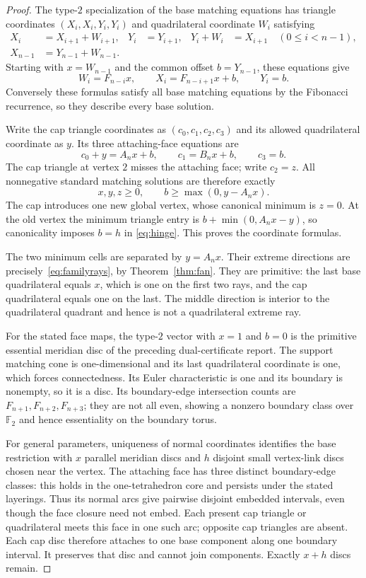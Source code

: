 \begin{proof}
The type-$2$ specialization of the base matching equations has triangle
coordinates $(X_i,X_i,Y_i,Y_i)$ and quadrilateral coordinate $W_i$ satisfying
\begin{align*}
 X_i&=X_{i+1}+W_{i+1},&Y_i&=Y_{i+1},&
 Y_i+W_i&=X_{i+1}\quad (0\le i<n-1),\\
 X_{n-1}&=Y_{n-1}+W_{n-1}.&&&
\end{align*}
Starting with $x=W_{n-1}$ and the common offset $b=Y_{n-1}$, these equations
give
\[
 W_i=F_{n-i}x,\qquad X_i=F_{n-i+1}x+b,\qquad Y_i=b.
\]
Conversely these formulas satisfy all base matching equations by the
Fibonacci recurrence, so they describe every base solution.

Write the cap triangle coordinates as $(c_0,c_1,c_2,c_3)$ and its allowed
quadrilateral coordinate as $y$. Its three attaching-face equations are
\[
 c_0+y=A_nx+b,\qquad c_1=B_nx+b,\qquad c_3=b.
\]
The cap triangle at vertex $2$ misses the attaching face; write $c_2=z$.
All nonnegative standard matching solutions are therefore exactly
\[
 x,y,z\ge0,\qquad b\ge\max(0,y-A_nx).
\]
The cap introduces one new global vertex, whose canonical minimum is
$z=0$. At the old vertex the minimum triangle entry is
$b+\min(0,A_nx-y)$, so canonicality imposes $b=h$ in
\eqref{eq:hinge}. This proves the coordinate formulas.

The two minimum cells are separated by $y=A_nx$. Their extreme directions
are precisely~\eqref{eq:familyrays}, by Theorem~\ref{thm:fan}. They are
primitive: the last base quadrilateral equals $x$, which is one on the first
two rays, and the cap quadrilateral equals one on the last. The middle
direction is interior to the quadrilateral quadrant and hence is not a
quadrilateral extreme ray.

For the stated face maps, the type-$2$ vector with $x=1$ and $b=0$ is the
primitive essential meridian disc of the preceding dual-certificate
report.\cite[Proposition~6.4]{incomingdual} The support matching cone is
one-dimensional and its last quadrilateral coordinate is one, which forces
connectedness. Its Euler characteristic is one and its boundary is nonempty,
so it is a disc. Its boundary-edge intersection counts are
$F_{n+1},F_{n+2},F_{n+3}$; they are not all even, showing a nonzero boundary
class over $\mathbb F_2$ and hence essentiality on the boundary torus.

For general parameters, uniqueness of normal coordinates identifies the base
restriction with $x$ parallel meridian discs and $h$ disjoint small
vertex-link discs chosen near the vertex. The attaching face has three
distinct boundary-edge classes: this holds in the one-tetrahedron core and
persists under the stated layerings. Thus its normal arcs give pairwise
disjoint embedded intervals, even though the face closure need not embed.
Each present cap triangle or quadrilateral meets this face in one such arc;
opposite cap triangles are absent. Each cap disc therefore attaches to one
base component along one boundary interval. It preserves that disc and
cannot join components. Exactly $x+h$ discs remain.


\end{proof}
